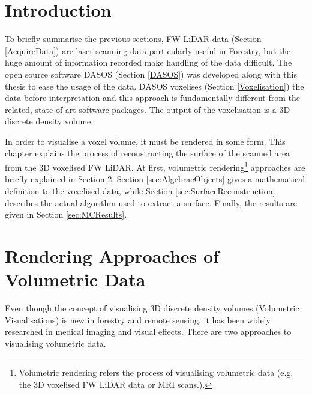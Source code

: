 \documentclass{subfiles}
\begin{document}
	

\section{Introduction}


\par To briefly summarise the previous sections, FW LiDAR data (Section \ref{AcquireData}) are laser scanning data particularly useful in Forestry, but the huge amount of information recorded make handling of the data difficult. The open source software DASOS (Section \ref{DASOS}) was developed along with this thesis to ease the usage of the data. DASOS voxelises (Section \ref{Voxelisation}) the data before interpretation and this approach is fundamentally different from the related, state-of-art software packages. The output of the voxelisation is a 3D discrete density volume. 

\par In order to visualise a voxel volume, it must be rendered in some form.  This chapter explains the process of reconstructing the surface of the scanned area from the 3D voxelised FW LiDAR. At first, volumetric rendering\footnote{Volumetric rendering refers the process of visualising volumetric data (e.g. the 3D voxelised FW LiDAR data or MRI scans.).} approaches are briefly explained in Section \ref{sec:RenderingApproaches}. Section \ref{sec:AlgebracObjects} gives a mathematical definition to the voxelised data, while Section \ref{sec:SurfaceReconstruction} describes the actual algorithm used to extract a surface. Finally, the results are given in Section \ref{sec:MCResults}. 


\section{Rendering Approaches of Volumetric Data}\label{sec:RenderingApproaches}
\par Even though the concept of visualising 3D discrete density volumes (Volumetric Visualisations) is new in forestry and remote sensing, it has been widely researched in medical imaging and visual effects. There are two approaches to visualising volumetric data.
\end{document}
